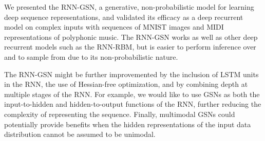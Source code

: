We presented the RNN-GSN, a generative, non-probabilistic model for learning deep sequence representations, and validated its efficacy as a deep recurrent model on complex inputs with sequences of MNIST images and MIDI representations of polyphonic music. The RNN-GSN works as well as other deep recurrent models such as the RNN-RBM, but is easier  to perform inference over and to sample from due to its non-probabilistic nature.

The RNN-GSN might be further improvemented by the inclusion of LSTM units in the RNN, the use of Hessian-free optimization, and by combining depth at multiple stages of the RNN. For example, we would like to use GSNs as both the input-to-hidden and hidden-to-output functions of the RNN, further reducing the complexity of representing the sequence. Finally, multimodal GSNs \cite{multi_gsn} could potentially provide benefits when the hidden representations of the input data distribution cannot be assumed to be unimodal.
